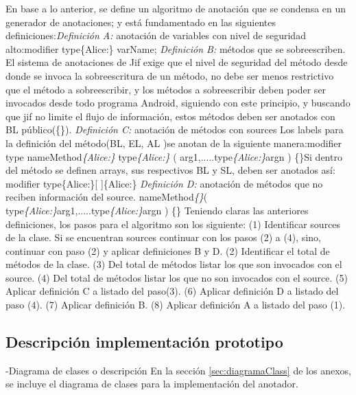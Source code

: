 En base a lo anterior, se define un algoritmo de anotación que se condensa en un
generador de anotaciones; y está fundamentado en las siguientes
definiciones:\newline \textit{Definición A:} anotación de variables con nivel de
seguridad alto:\newline modifier type\{Alice:\} varName;\newline 
\textit{Definición B:} métodos que se sobreescriben. El sistema de anotaciones
de Jif exige que el nivel de seguridad del método desde donde se invoca la
sobreescritura de un método, no debe ser menos restrictivo que el método a
sobreescribir, y los métodos a sobreescribir deben poder ser invocados desde
todo programa Android, siguiendo con este principio, y buscando que jif no
limite el flujo de información, estos métodos deben ser anotados con BL
público(\{\}).\newline 
\textit{Definición C:} anotación de métodos con sources\newline
Los labels para la definición del método(BL, EL, AL )se anotan de la
siguiente manera:\newline modifier type
nameMethod\textit{\{Alice:\}} type\textit{\{Alice:\}}
( arg1,.....type\textit{\{Alice:\}}argn ) \{\}\newline Si dentro del método se
definen arrays, sus respectivos BL y SL, deben ser anotados así: modifier type\{Alice:\}[ ]\{Alice:\}\newline
\textit{Definición D:} anotación de métodos que no reciben información del
source. 
nameMethod\textit{\{\}}(
type\textit{\{Alice:\}}arg1,.....type\textit{\{Alice:\}}argn ) \{\}\newline
Teniendo claras las anteriores definiciones, los pasos para el algoritmo son los
siguiente:\newline
(1) Identificar sources de la clase. Si se encuentran sources continuar con
los pasos (2) a (4), sino, continuar con paso (2) y aplicar definiciones B y
D.\newline
(2) Identificar el total de métodos de la clase.\newline
(3) Del total de métodos listar los que son invocados con el source.\newline
(4) Del total de métodos listar los que no son invocados con el source.\newline
(5) Aplicar definición C a listado del paso(3).\newline
(6) Aplicar definición D a listado del paso (4).\newline
(7) Aplicar definición B. \newline
(8) Aplicar definición A a listado del paso (1).

\subsection{Descripción implementación prototipo}
-Diagrama de clases o descripción\newline
En la sección \ref{sec:diagramaClass} de los anexos, se incluye el diagrama de
clases para la implementación del anotador.

